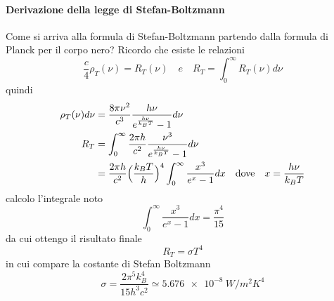 \paragraph{Derivazione della legge di Stefan-Boltzmann}
Come si arriva alla formula di Stefan-Boltzmann partendo dalla formula di Planck per il corpo nero?
Ricordo che esiste le relazioni
$$\frac{ c}{4 } \rho_T(\nu) = R_T(\nu) \quad e \quad R_T = \int_0^{\infty} R_T(\nu)d\nu$$
quindi
\begin{equation}
\begin{split}
\rho_T(\nu) d\nu & = \frac{ 8\pi\nu^2}{c^3 } \frac{ h\nu}{ e^{ \frac{ h\nu}{k_BT }} - 1} d\nu \\
R_T &= \int_0^{\infty} \frac{ 2\pi h}{c^2 } \frac{ \nu^3}{e^{ \frac{ h\nu}{k_BT } } - 1 } d\nu \\
& = \frac{ 2\pi h}{c^2 } \Bigl(  \frac{ k_BT}{h }  \Bigr)^4 \int_0^{\infty} \frac{ x^3}{e^x - 1 }dx \quad \mbox{dove} \quad x=\frac{ h\nu}{k_BT }\\
\end{split}
\end{equation}
calcolo l'integrale noto
\begin{equation}
\int_0^{\infty} \frac{ x^3}{e^x - 1 }dx = \frac{ \pi^4}{15 }
\end{equation}
da cui ottengo il risultato finale 
\begin{equation}
R_T = \sigma T^4
\end{equation}
in cui compare la costante di Stefan Boltzmann
\begin{equation}
\sigma = \frac{ 2\pi^5 k_B^4}{15 h^3 c^2 } \simeq \SI{5.676e-8}{W / m^2 K^4}
\end{equation}

\newpage


